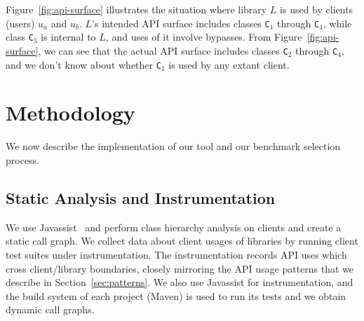Figure~\ref{fig:api-surface} illustrates the situation where library
$L$ is used by clients (users) $u_a$ and $u_b$. $L$'s intended API surface
includes classes \texttt{C}$_1$ through \texttt{C}$_4$, while class
\texttt{C}$_5$ is internal to $L$, and uses of it involve bypasses. From Figure~\ref{fig:api-surface},
we can see that the actual API surface includes classes
\texttt{C}$_2$ through \texttt{C}$_4$, and we don't know about whether
\texttt{C}$_1$ is used by any extant client.


\section{Methodology}
\label{sec:methodology}

We now describe the implementation of our tool and our benchmark selection process.

\subsection{Static Analysis and Instrumentation}
\label{sec:methodology}

We use Javassist~\cite{chiba00:_load_struc_reflec_java} and perform class hierarchy analysis on clients
and create a static call graph. We collect data about client usages of libraries by running client
test suites under instrumentation. The instrumentation records API
uses which cross client/library boundaries, closely mirroring the API
usage patterns that we describe in
Section~\ref{sec:patterns}. We also use Javassist for instrumentation,
and the build system of each project (Maven) is used to run its
tests and we obtain dynamic call graphs. 
\\

